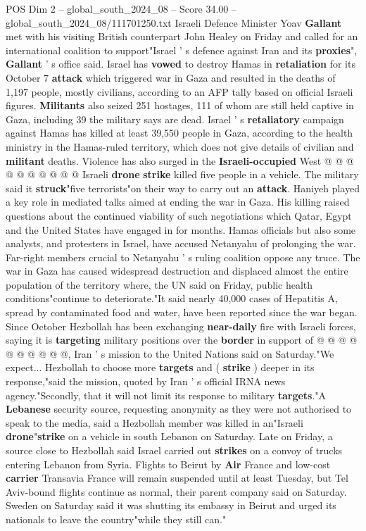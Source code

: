 \begin{textsample}{POS Dim 2 – global\_south\_2024\_08 – Score 34.00 – global\_south\_2024\_08/111701250.txt}
Israeli Defence Minister Yoav \textbf{Gallant} met with his visiting British counterpart John Healey on Friday and called for an international coalition to support"Israel ' s defence against Iran and its \textbf{proxies}", \textbf{Gallant} ' s office said.
Israel has \textbf{vowed} to destroy Hamas in \textbf{retaliation} for its October 7 \textbf{attack} which triggered war in Gaza and resulted in the deaths of 1,197 people, mostly civilians, according to an AFP tally based on official Israeli figures. \textbf{Militants} also seized 251 hostages, 111 of whom are still held captive in Gaza, including 39 the military says are dead.
Israel ' s \textbf{retaliatory} campaign against Hamas has killed at least 39,550 people in Gaza, according to the health ministry in the Hamas-ruled territory, which does not give details of civilian and \textbf{militant} deaths.
Violence has also surged in the \textbf{Israeli-occupied} West @ @ @ @ @ @ @ @ @ @ Israeli \textbf{drone} \textbf{strike} killed five people in a vehicle.
The military said it \textbf{struck}"five terrorists"on their way to carry out an \textbf{attack}.
Haniyeh played a key role in mediated talks aimed at ending the war in Gaza.
His killing raised questions about the continued viability of such negotiations which Qatar, Egypt and the United States have engaged in for months.
Hamas officials but also some analysts, and protesters in Israel, have accused Netanyahu of prolonging the war.
Far-right members crucial to Netanyahu ' s ruling coalition oppose any truce.
The war in Gaza has caused widespread destruction and displaced almost the entire population of the territory where, the UN said on Friday, public health conditions"continue to deteriorate."It said nearly 40,000 cases of Hepatitis A, spread by contaminated food and water, have been reported since the war began.
Since October Hezbollah has been exchanging \textbf{near-daily} fire with Israeli forces, saying it is \textbf{targeting} military positions over the \textbf{border} in support of @ @ @ @ @ @ @ @ @ @, Iran ' s mission to the United Nations said on Saturday."We expect...
Hezbollah to choose more \textbf{targets} and ( \textbf{strike} ) deeper in its response,"said the mission, quoted by Iran ' s official IRNA news agency."Secondly, that it will not limit its response to military \textbf{targets}."A \textbf{Lebanese} security source, requesting anonymity as they were not authorised to speak to the media, said a Hezbollah member was killed in an"Israeli \textbf{drone}"\textbf{strike} on a vehicle in south Lebanon on Saturday.
Late on Friday, a source close to Hezbollah said Israel carried out \textbf{strikes} on a convoy of trucks entering Lebanon from Syria.
Flights to Beirut by \textbf{Air} France and low-cost \textbf{carrier} Transavia France will remain suspended until at least Tuesday, but Tel Aviv-bound flights continue as normal, their parent company said on Saturday.
Sweden on Saturday said it was shutting its embassy in Beirut and urged its nationals to leave the country"while they still can."


\end{textsample}
